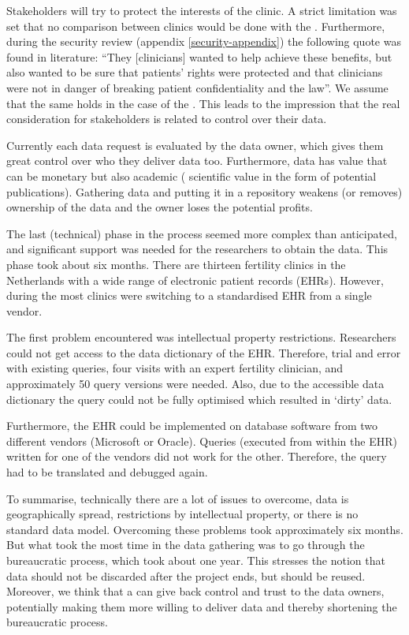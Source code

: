 Stakeholders will try to protect the interests of the clinic.
A strict limitation was set that no comparison between clinics would be done with the \projectdata{}.
Furthermore, during the security review (appendix \ref{security-appendix}) the following quote was found in literature: ``They [clinicians] wanted to help achieve these benefits, but also wanted to be sure that patients' rights were protected and that clinicians were not in danger of breaking patient confidentiality and the law''.
We assume that the same holds in the case of the \project{}.
This leads to the impression that the real consideration for stakeholders is related to control over their data.

Currently each data request is evaluated by the data owner, which gives them great control over who they deliver data too.
Furthermore, data has value that can be monetary but also academic (\ie{} scientific value in the form of potential publications).
Gathering data and putting it in a repository weakens (or removes) ownership of the data and the owner loses the potential profits.

The last (technical) phase in the process seemed more complex than anticipated, and significant support was needed for the \project{} researchers to obtain the data.
This phase took about six months.
There are thirteen fertility clinics in the Netherlands with a wide range of electronic patient records (EHRs).
However, during the \project{} most clinics were switching to a standardised EHR from a single vendor.

The first problem encountered was intellectual property restrictions.
Researchers could not get access to the data dictionary of the EHR.
Therefore, trial and error with existing queries, four visits with an expert fertility clinician, and approximately 50 query versions were needed.
Also, due to the accessible data dictionary the query could not be fully optimised which resulted in `dirty' data.

Furthermore, the EHR could be implemented on database software from two different vendors (Microsoft or Oracle).
Queries (executed from within the EHR) written for one of the vendors did not work for the other.
Therefore, the query had to be translated and debugged again.

To summarise, technically there are a lot of issues to overcome, \eg{} data is geographically spread, restrictions by intellectual property, or there is no standard data model.
Overcoming these problems took approximately six months.
But what took the most time in the \project{} data gathering was to go through the bureaucratic process, which took about one year.
This stresses the notion that data should not be discarded after the project ends, but should be reused.
Moreover, we think that a \ivfsystem{} can give back control and trust to the data owners,
potentially making them more willing to deliver data and thereby shortening the bureaucratic process.

